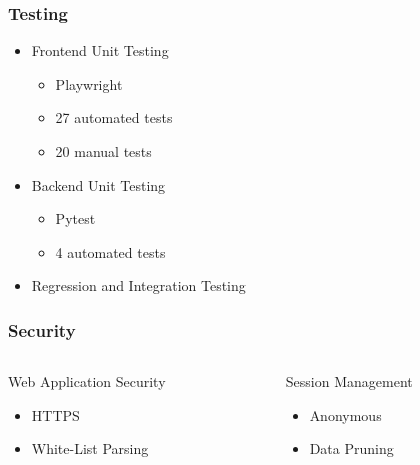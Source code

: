 \documentclass{beamer}
\begin{document}
\begin{frame}
    \frametitle{Testing}
    \begin{itemize}
        \item Frontend Unit Testing 
            \begin{itemize}
                \item Playwright
                \item 27 automated tests
                \item 20 manual tests
            \end{itemize} \pause
        \item Backend Unit Testing 
            \begin{itemize}
                \item Pytest
                \item 4 automated tests
            \end{itemize} \pause
        \item Regression and Integration Testing
    \end{itemize}
\end{frame}

\begin{frame}
    \frametitle{Security}
    \begin{columns}
        \begin{column}{0.5\textwidth}
            \begin{block}{Web Application Security}
                \begin{itemize}
                    \item HTTPS
                    \item White-List Parsing
                \end{itemize}
            \end{block}
        \end{column}
        \pause
        \begin{column}{0.5\textwidth}
            \begin{block}{Session Management}
                \begin{itemize}
                    \item Anonymous
                    \item Data Pruning
                \end{itemize}
            \end{block}
        \end{column}
    \end{columns}
\end{frame}
\end{document}
